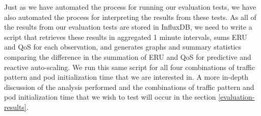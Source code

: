 Just as we have automated the process for running our evaluation tests, we have
also automated the process for interpreting the results from these tests. As all
of the results from our evaluation tests are stored in InfluxDB, we need to
write a script that retrieves these results in aggregated 1 minute intervals,
sums ERU and QoS for each observation, and generates graphs and summary
statistics comparing the difference in the summation of ERU and QoS for
predictive and reactive auto-scaling. We run this same script for all four
combinations of traffic pattern and pod initialization time that we are
interested in. A more in-depth discussion of the analysis performed and the
combinations of traffic pattern and pod initialization time that we wish to test
will occur in the section \ref{evaluation-results}.
